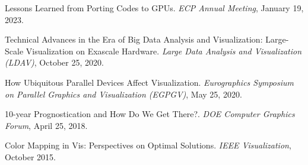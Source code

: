 \begin{enumerate}[label={[\arabic*]}, left=0pt]
\item  %
  Lessons Learned from Porting Codes to GPUs.
  \emph{ECP Annual Meeting}, January 19, 2023.
\item  %
  Technical Advances in the Era of Big Data Analysis and Visualization: Large-Scale Visualization on Exascale Hardware.
  \emph{Large Data Analysis and Visualization (LDAV)}, October 25, 2020.
\item  %
  How Ubiquitous Parallel Devices Affect Visualization.
  \emph{Eurographics Symposium on Parallel Graphics and Visualization (EGPGV)}, May 25, 2020.
\item  %
  10-year Prognostication and How Do We Get There?.
  \emph{DOE Computer Graphics Forum}, April 25, 2018.
\item  %
  Color Mapping in Vis: Perspectives on Optimal Solutions.
  \emph{IEEE Visualization}, October 2015.
\end{enumerate}